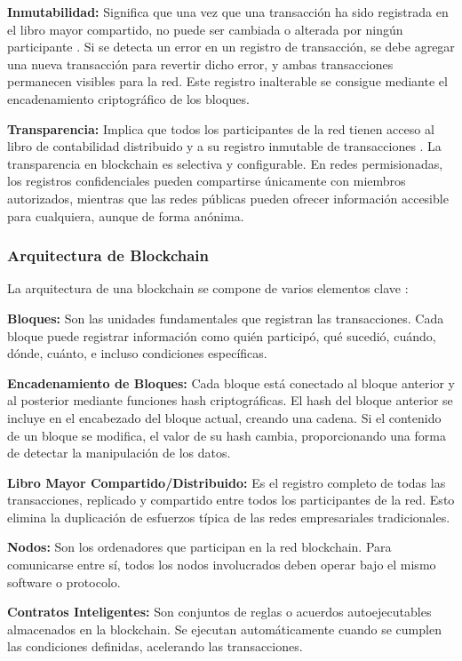 \documentclass[spanish,12pt,letterpaper]{report}
\begin{document}
\textbf{Inmutabilidad:} Significa que una vez que una transacción ha sido registrada en el libro mayor compartido, no puede ser cambiada o alterada por ningún participante \parencite{aws2025blockchain}. Si se detecta un error en un registro de transacción, se debe agregar una nueva transacción para revertir dicho error, y ambas transacciones permanecen visibles para la red. Este registro inalterable se consigue mediante el encadenamiento criptográfico de los bloques.

\textbf{Transparencia:} Implica que todos los participantes de la red tienen acceso al libro de contabilidad distribuido y a su registro inmutable de transacciones \parencite{ibm2025blockchain}. La transparencia en blockchain es selectiva y configurable. En redes permisionadas, los registros confidenciales pueden compartirse únicamente con miembros autorizados, mientras que las redes públicas pueden ofrecer información accesible para cualquiera, aunque de forma anónima.

\subsubsection{Arquitectura de Blockchain}

La arquitectura de una blockchain se compone de varios elementos clave \parencite{bartolomeo2025intro}:

\textbf{Bloques:} Son las unidades fundamentales que registran las transacciones. Cada bloque puede registrar información como quién participó, qué sucedió, cuándo, dónde, cuánto, e incluso condiciones específicas.

\textbf{Encadenamiento de Bloques:} Cada bloque está conectado al bloque anterior y al posterior mediante funciones hash criptográficas. El hash del bloque anterior se incluye en el encabezado del bloque actual, creando una cadena. Si el contenido de un bloque se modifica, el valor de su hash cambia, proporcionando una forma de detectar la manipulación de los datos.

\textbf{Libro Mayor Compartido/Distribuido:} Es el registro completo de todas las transacciones, replicado y compartido entre todos los participantes de la red. Esto elimina la duplicación de esfuerzos típica de las redes empresariales tradicionales.

\textbf{Nodos:} Son los ordenadores que participan en la red blockchain. Para comunicarse entre sí, todos los nodos involucrados deben operar bajo el mismo software o protocolo.

\textbf{Contratos Inteligentes:} Son conjuntos de reglas o acuerdos autoejecutables almacenados en la blockchain. Se ejecutan automáticamente cuando se cumplen las condiciones definidas, acelerando las transacciones.
\end{document}
